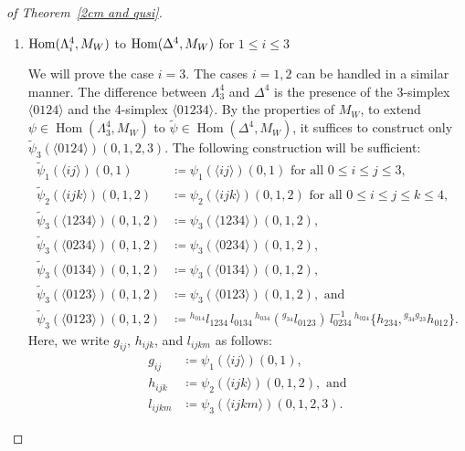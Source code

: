 \documentclass{tac}
\begin{document}
\begin{proof}[of Theorem~\ref{2cm and qusi}]
\begin{enumerate}


Here, we write \( g_{ij} \) and \( h_{ijk} \) as follows:
\begin{align*}
g_{ij}&\coloneqq \psi_1(\langle ij \rangle)(0,1)\\
h_{ijk}&\coloneqq \psi_2(\langle ijk \rangle)(0,1,2).
\end{align*}

\item ${\rm Hom}(\Lambda^4_i, M_W)$ to ${\rm Hom}(\Delta^4, M_W)$ for $1 \le i \le 3$

We will prove the case \( i = 3 \). The cases \( i = 1, 2 \) can be handled in a similar manner.
The difference between \( \Lambda^4_3 \) and \( \Delta^4 \) is the presence of the 3-simplex \( \langle 0124 \rangle \) and the 4-simplex \( \langle 01234 \rangle \).
By the properties of \( M_W \), to extend \( \psi \in \operatorname{Hom}(\Lambda^4_3, M_W) \) to  
\( \tilde{\psi} \in \operatorname{Hom}(\Delta^4, M_W) \),  
it suffices to construct only  $\tilde{\psi}_3(\langle 0124 \rangle)(0,1,2,3)$.
The following construction will be sufficient:  
\begin{align*}
\tilde{\psi}_1(\langle ij \rangle)(0,1) &\coloneqq {\psi}_1(\langle ij \rangle)(0,1)  \text{ for all } 0\le i\le j \le 3,\\
\tilde{\psi}_2(\langle ijk \rangle)(0,1,2) &\coloneqq {\psi}_2(\langle ijk \rangle)(0,1,2)  \text{ for all }  0\le i\le j \le k\le 4,\\
\tilde{\psi}_3(\langle 1234 \rangle)(0,1,2) &\coloneqq {\psi}_3(\langle 1234 \rangle)(0,1,2),\\
\tilde{\psi}_3(\langle 0234 \rangle)(0,1,2) &\coloneqq {\psi}_3(\langle 0234 \rangle)(0,1,2),\\
\tilde{\psi}_3(\langle 0134 \rangle)(0,1,2) &\coloneqq {\psi}_3(\langle 0134 \rangle)(0,1,2),\\
\tilde{\psi}_3(\langle 0123 \rangle)(0,1,2) &\coloneqq {\psi}_3(\langle 0123 \rangle)(0,1,2), \text{ and }\\
\tilde{\psi}_3(\langle 0123 \rangle)(0,1,2) &\coloneqq {}^{h_{014}} l_{1234} \, l_{0134} \, {}^{h_{034}}\left( {}^{g_{34}} l_{0123}\right) \, l^{-1}_{0234} \, {}^{h_{024}} \{ h_{234}, {}^{g_{34} g_{23}} h_{012} \}.
\end{align*}
Here, we write \( g_{ij} \), \( h_{ijk} \), and \( l_{ijkm} \)  as follows: 
\begin{align*}
g_{ij}&\coloneqq \psi_1(\langle ij \rangle)(0,1),\\
h_{ijk}&\coloneqq \psi_2(\langle ijk \rangle)(0,1,2), \text{ and}\\
l_{ijkm}&\coloneqq \psi_3(\langle ijkm \rangle)(0,1,2,3).
\end{align*}


\end{enumerate}
\end{proof}
\end{document}
